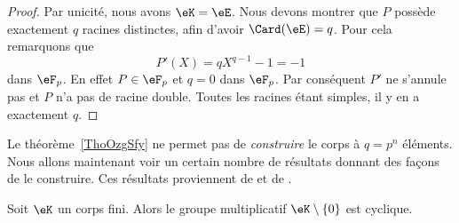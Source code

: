 \begin{proof}
	Par unicité, nous avons \( \eK=\eE\). Nous devons montrer que \( P\) possède exactement \( q\) racines distinctes, afin d'avoir \( \Card(\eE)=q\). Pour cela remarquons que
	\begin{equation}
		P'(X)=qX^{q-1}-1=-1
	\end{equation}
	dans \( \eF_p\). En effet \( P\in\eF_p\) et \( q=0\) dans \( \eF_p\). Par conséquent \( P'\) ne s'annule pas et \( P\) n'a pas de racine double. Toutes les racines étant simples, il y en a exactement \( q\).
\end{proof}

Le théorème~\ref{ThoOzgSfy} ne permet pas de \emph{construire} le corps à \( q=p^n\) éléments. Nous allons maintenant voir un certain nombre de résultats donnant des façons de le construire. Ces résultats proviennent de \cite{MichelMerlecorpsfinis,GabrielPeyre,RodierCorpsFinis} et de .

\begin{proposition}      \label{PropnfebjI}
	Soit \( \eK\) un corps fini. Alors le groupe multiplicatif \( \eK\setminus\{ 0 \}\) est cyclique.
\end{proposition}

